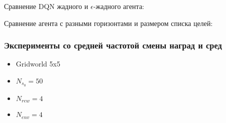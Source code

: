 \documentclass[a4paper]{article}
\begin{document}
Сравнение DQN жадного и $\epsilon$-жадного агента:


Сравнение агента с разными горизонтами и размером списка целей:

  

  

  

\subsubsection{Эксперименты со средней частотой смены наград и сред}

\begin{itemize}
  \item Gridworld 5x5
  \item $N_{s_0} = 50$
  \item $N_{rew} = 4$
  \item $N_{env} = 4$
\end{itemize}
\end{document}
